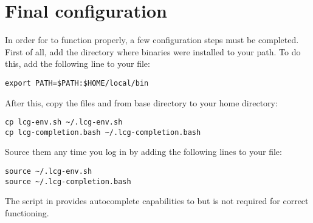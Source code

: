 \section{Final configuration}
\label{sec:configuration}
In order for \progname to function properly, a few configuration steps
must be completed. First of all, add the directory where \progname
binaries were installed to your path. To do this, add the following
line to your  file:
\begin{lstlisting}
export PATH=$PATH:$HOME/local/bin
\end{lstlisting}
After this, copy the files  and
 from \progname base directory to your
home directory:
\begin{lstlisting}
cp lcg-env.sh ~/.lcg-env.sh
cp lcg-completion.bash ~/.lcg-completion.bash
\end{lstlisting}
Source them any time you log in by adding the following lines to your
 file:
\begin{lstlisting}
source ~/.lcg-env.sh
source ~/.lcg-completion.bash
\end{lstlisting}
The script in  provides autocomplete
capabilities to \progname but is not required for correct
functioning.

